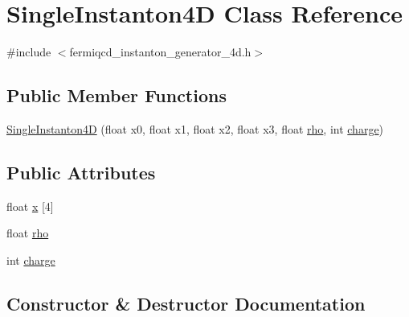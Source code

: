 \hypertarget{class_single_instanton4_d}{}\section{Single\+Instanton4D Class Reference}
\label{class_single_instanton4_d}


{\ttfamily \#include $<$fermiqcd\+\_\+instanton\+\_\+generator\+\_\+4d.\+h$>$}

\subsection*{Public Member Functions}
\begin{DoxyCompactItemize}
\item 
\hyperlink{class_single_instanton4_d_ad25c4659762466242a58cb522d81caa2}{Single\+Instanton4D} (float x0, float x1, float x2, float x3, float \hyperlink{class_single_instanton4_d_a5aaaa7bb2480121238f73413722f571c}{rho}, int \hyperlink{class_single_instanton4_d_a4a503a7904b1a17e7b192b66885641cb}{charge})
\end{DoxyCompactItemize}
\subsection*{Public Attributes}
\begin{DoxyCompactItemize}
\item 
float \hyperlink{class_single_instanton4_d_a19c5efb9db26b759c75ef5bea8a0748e}{x} \mbox{[}4\mbox{]}
\item 
float \hyperlink{class_single_instanton4_d_a5aaaa7bb2480121238f73413722f571c}{rho}
\item 
int \hyperlink{class_single_instanton4_d_a4a503a7904b1a17e7b192b66885641cb}{charge}
\end{DoxyCompactItemize}


\subsection{Constructor \& Destructor Documentation}
\mbox{\label{class_single_instanton4_d_ad25c4659762466242a58cb522d81caa2}} 
